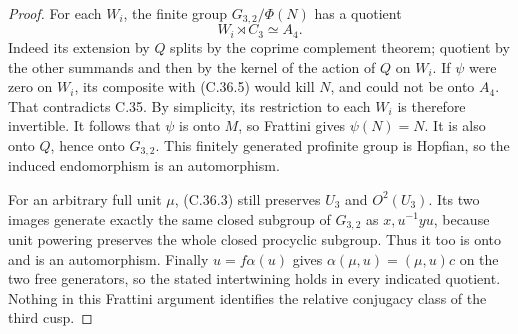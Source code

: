 \begin{proof}
For each \(W_i\), the finite group
\(G_{3,2}/\Phi(N)\) has a quotient
\[
                        W_i\rtimes C_3\simeq A_4.
 \tag{C.36.5}
\]
Indeed its extension by \(Q\) splits by the coprime
complement theorem; quotient by the other summands and then
by the kernel of the action of \(Q\) on \(W_i\).
If \(\psi\) were zero on \(W_i\), its composite with
(C.36.5) would kill \(N\), and could not be onto \(A_4\).
That contradicts C.35. By simplicity, its restriction to
each \(W_i\) is therefore invertible. It follows that
\(\psi\) is onto \(M\), so Frattini gives
\(\psi(N)=N\). It is also onto \(Q\), hence onto
\(G_{3,2}\). This finitely generated profinite group is
Hopfian, so the induced endomorphism is an automorphism.

For an arbitrary full unit \(\mu\), (C.36.3) still
preserves \(U_3\) and \(O^2(U_3)\). Its two images
generate exactly the same closed subgroup of \(G_{3,2}\)
as \(x,u^{-1}yu\), because unit powering preserves the
whole closed procyclic subgroup. Thus it too is onto and
is an automorphism. Finally \(u=f\alpha(u)\) gives
\(\alpha(\mu,u)=(\mu,u)c\) on the two free generators,
so the stated intertwining holds in every indicated quotient.
Nothing in this Frattini argument identifies the relative
conjugacy class of the third cusp.
\end{proof}
